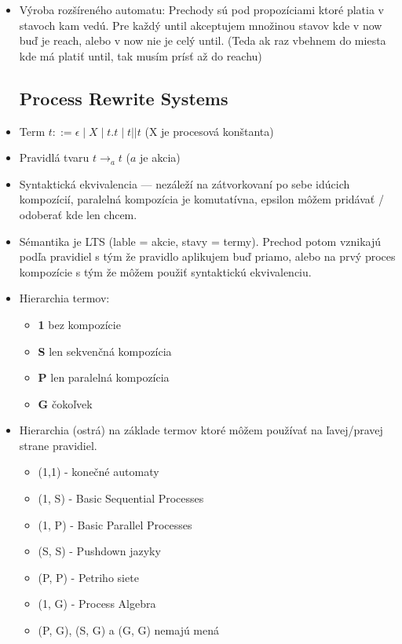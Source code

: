 \documentclass[paper=a4, fontsize=11pt]{scrartcl} %
\numberwithin{equation}{section} %
\numberwithin{figure}{section} %
\numberwithin{table}{section} %
\begin{document}
\begin{itemize}
	\item Výroba rozšíreného automatu: Prechody sú pod propozíciami ktoré platia v stavoch kam vedú. Pre každý until akceptujem množinou stavov kde v now buď je reach, alebo v now nie je celý until. (Teda ak raz vbehnem do miesta kde má platiť until, tak musím prísť až do reachu)

	\subsection{Process Rewrite Systems}
	
	\item Term $t ::= \epsilon \mid X \mid t . t \mid t || t$ (X je procesová konštanta)
	
	\item Pravidlá tvaru $t \to_a t$ ($a$ je akcia)
	
	\item Syntaktická ekvivalencia — nezáleží na zátvorkovaní po sebe idúcich kompozícií, paralelná kompozícia je komutatívna, epsilon môžem pridávať / odoberať kde len chcem.
	
	\item Sémantika je LTS (lable = akcie, stavy = termy). Prechod potom vznikajú podľa pravidiel s tým že pravidlo aplikujem buď priamo, alebo na prvý proces kompozície s tým že môžem použiť syntaktickú ekvivalenciu.
	
	\item Hierarchia termov:
	
	\begin{itemize}
		\item \textbf{1} bez kompozície
		\item \textbf{S} len sekvenčná kompozícia
		\item \textbf{P} len paralelná kompozícia
		\item \textbf{G} čokoľvek
	\end{itemize}

	\item Hierarchia (ostrá) na základe termov ktoré môžem používať na ľavej/pravej strane pravidiel.
	
	\begin{itemize}
		\item (1,1) - konečné automaty
		\item (1, S) - Basic Sequential Processes
		\item (1, P) - Basic Parallel Processes
		\item (S, S) - Pushdown jazyky
		\item (P, P) - Petriho siete
		\item (1, G) - Process Algebra
		\item (P, G), (S, G) a (G, G) nemajú mená
	\end{itemize}


\end{itemize}
\end{document}
